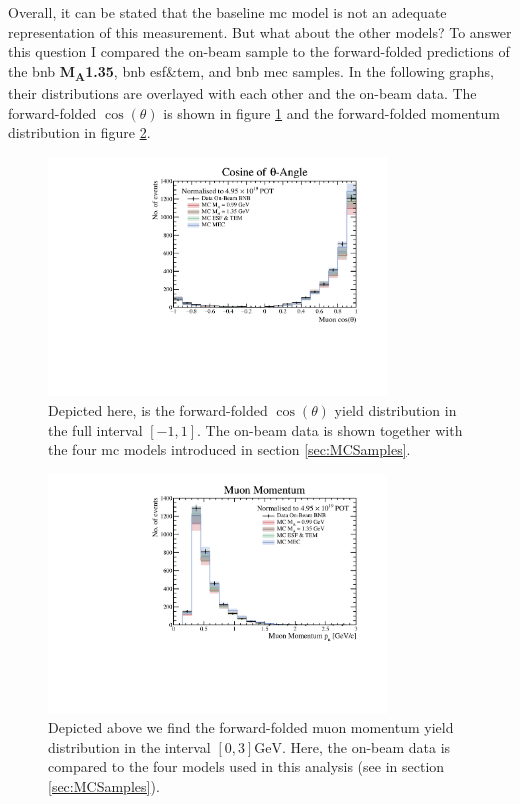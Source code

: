 Overall, it can be stated that the baseline \gls{mc} model is not an adequate representation of this measurement. But what about the other models? To answer this question I compared the on-beam sample to the forward-folded predictions of the \gls{bnb} \textbf{M\textsubscript{A}\num{1.35}}, \gls{bnb} \gls{esf}\&\gls{tem}, and \gls{bnb} \gls{mec} samples. In the following graphs, their distributions are overlayed with each other and the on-beam data. The forward-folded $\cos{(\theta)}$ is shown in figure \ref{fig:ModelComparisonCosTheta} and the forward-folded momentum distribution in figure \ref{fig:ModelComparisonMomentum}.

\begin{figure}[htbp]
    \centering
    \includegraphics[width=0.8\textwidth]{images/FirstCCInclusive/ModelComparison/ModelComparisonCosTheta.pdf}
    \caption[Model Comparison $\cos{(\theta)}$ Distribution]{Depicted here, is the forward-folded $\cos{(\theta)}$ yield distribution in the full interval $[-1,1]$. The on-beam data is shown together with the four \gls{mc} models introduced in section \ref{sec:MCSamples}.}
    \label{fig:ModelComparisonCosTheta}
\end{figure}
\begin{figure}[htbp]
    \centering
    \includegraphics[width=0.8\textwidth]{images/FirstCCInclusive/ModelComparison/ModelComparisonMomentum.pdf}
    \caption[Model Comparison Muon Momentum Distribution]{Depicted above we find the forward-folded muon momentum yield distribution in the interval $[0,3] \si{\giga\electronvolt}$. Here, the on-beam data is compared to the four models used in this analysis (see in section \ref{sec:MCSamples}).}
    \label{fig:ModelComparisonMomentum}
\end{figure}
